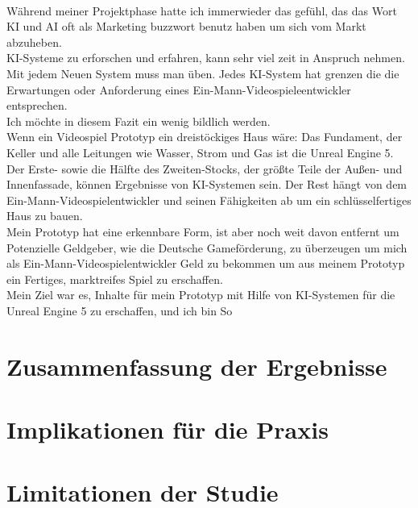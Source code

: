 \\
Während meiner Projektphase hatte ich immerwieder das gefühl, das das Wort KI und AI oft als Marketing buzzwort benutz haben um sich vom Markt abzuheben.
\\
KI-Systeme zu erforschen und erfahren, kann sehr viel zeit in Anspruch nehmen. Mit jedem Neuen System muss man üben. Jedes KI-System hat grenzen die die Erwartungen oder Anforderung eines Ein-Mann-Videospieleentwickler entsprechen.
\\
Ich möchte in diesem Fazit ein wenig bildlich werden.
\\
Wenn ein Videospiel Prototyp ein dreistöckiges Haus wäre:
Das Fundament, der Keller und alle Leitungen wie Wasser, Strom und Gas ist die Unreal Engine 5.
Der Erste- sowie die Hälfte des Zweiten-Stocks, der größte Teile der Außen- und Innenfassade, können Ergebnisse von KI-Systemen sein.
Der Rest hängt von dem Ein-Mann-Videospielentwickler und seinen Fähigkeiten ab um ein schlüsselfertiges Haus zu bauen.
\\
Mein Prototyp hat eine erkennbare Form, ist aber noch weit davon entfernt um Potenzielle Geldgeber, wie die Deutsche Gameförderung, zu überzeugen um mich als Ein-Mann-Videospielentwickler Geld zu bekommen um aus meinem Prototyp ein Fertiges, marktreifes Spiel zu erschaffen.
\\
Mein Ziel war es, Inhalte für mein Prototyp mit Hilfe von KI-Systemen für die Unreal Engine 5 zu erschaffen, und ich bin So


\section{Zusammenfassung der Ergebnisse}
\section{Implikationen für die Praxis}
\section{Limitationen der Studie}
